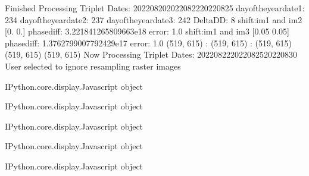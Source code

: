 \documentclass[letterpaper,10pt]{sphinxmanual}
\begin{document}
\begin{sphinxVerbatim}[commandchars=\\\{\}]
Finished Processing Triplet Dates:  20220820\PYGZhy{}20220822\PYGZhy{}20220825
day\PYGZus{}of\PYGZus{}the\PYGZus{}year\PYGZus{}date1:  234
\PYGZhy{}\PYGZhy{}\PYGZhy{}\PYGZhy{}\PYGZhy{}\PYGZhy{}\PYGZhy{}\PYGZhy{}\PYGZhy{}\PYGZhy{}\PYGZhy{}\PYGZhy{}\PYGZhy{}\PYGZhy{}\PYGZhy{}\PYGZhy{}\PYGZhy{}\PYGZhy{}\PYGZhy{}\PYGZhy{}\PYGZhy{}
day\PYGZus{}of\PYGZus{}the\PYGZus{}year\PYGZus{}date2:  237
\PYGZhy{}\PYGZhy{}\PYGZhy{}\PYGZhy{}\PYGZhy{}\PYGZhy{}\PYGZhy{}\PYGZhy{}\PYGZhy{}\PYGZhy{}\PYGZhy{}\PYGZhy{}\PYGZhy{}\PYGZhy{}\PYGZhy{}\PYGZhy{}\PYGZhy{}\PYGZhy{}\PYGZhy{}\PYGZhy{}\PYGZhy{}
day\PYGZus{}of\PYGZus{}the\PYGZus{}year\PYGZus{}date3:  242
\PYGZhy{}\PYGZhy{}\PYGZhy{}\PYGZhy{}\PYGZhy{}\PYGZhy{}\PYGZhy{}\PYGZhy{}\PYGZhy{}\PYGZhy{}\PYGZhy{}\PYGZhy{}\PYGZhy{}\PYGZhy{}\PYGZhy{}\PYGZhy{}\PYGZhy{}\PYGZhy{}\PYGZhy{}\PYGZhy{}\PYGZhy{}
Delta\PYGZus{}DD: 8
shift:im1 and im2 [0. 0.] phasediff: \PYGZhy{}3.221841265809663e\PYGZhy{}18 error: 1.0
shift:im1 and im3 [0.05 0.05] phasediff: \PYGZhy{}1.3762799007792429e\PYGZhy{}17 error: 1.0
(519, 615) :  (519, 615) :  (519, 615)
(519, 615)
(519, 615)
Now Processing Triplet Dates:  20220822\PYGZhy{}20220825\PYGZhy{}20220830
 User selected to ignore resampling raster images 



\PYGZlt{}IPython.core.display.Javascript object\PYGZgt{}
\end{sphinxVerbatim}



\begin{sphinxVerbatim}[commandchars=\\\{\}]
\PYGZlt{}IPython.core.display.Javascript object\PYGZgt{}
\end{sphinxVerbatim}



\begin{sphinxVerbatim}[commandchars=\\\{\}]
\PYGZlt{}IPython.core.display.Javascript object\PYGZgt{}
\end{sphinxVerbatim}



\begin{sphinxVerbatim}[commandchars=\\\{\}]
\PYGZlt{}IPython.core.display.Javascript object\PYGZgt{}
\end{sphinxVerbatim}



\begin{sphinxVerbatim}[commandchars=\\\{\}]
\PYGZlt{}IPython.core.display.Javascript object\PYGZgt{}
\end{sphinxVerbatim}
\end{document}
